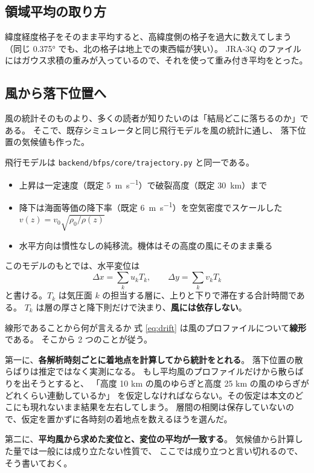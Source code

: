 \subsection{領域平均の取り方}

緯度経度格子をそのまま平均すると、高緯度側の格子を過大に数えてしまう
（同じ \ang{0.375} でも、北の格子は地上での東西幅が狭い）。
JRA-3Q のファイルにはガウス求積の重みが入っているので、それを使って重み付き平均をとった。

\subsection{風から落下位置へ}
\label{sec:drift}

風の統計そのものより、多くの読者が知りたいのは「結局どこに落ちるのか」である。
そこで、既存シミュレータと同じ飛行モデルを風の統計に通し、
落下位置の気候値も作った。

飛行モデルは \texttt{backend/bfps/core/trajectory.py} と同一である。

\begin{itemize}
  \item 上昇は一定速度（既定 \SI{5}{\metre\per\second}）で破裂高度（既定 \SI{30}{\kilo\metre}）まで
  \item 降下は海面等価の降下率（既定 \SI{6}{\metre\per\second}）を空気密度でスケールした
        $v(z) = v_0\sqrt{\rho_0/\rho(z)}$
  \item 水平方向は慣性なしの純移流。機体はその高度の風にそのまま乗る
\end{itemize}

このモデルのもとでは、水平変位は
\begin{equation}
  \Delta x = \sum_k u_k T_k, \qquad \Delta y = \sum_k v_k T_k
  \label{eq:drift}
\end{equation}
と書ける。$T_k$ は気圧面 $k$ の担当する層に、上りと下りで滞在する合計時間である。
$T_k$ は層の厚さと降下則だけで決まり、\textbf{風には依存しない}。

\begin{whybox}{線形であることから何が言えるか}
式 \eqref{eq:drift} は風のプロファイルについて\textbf{線形}である。
そこから 2 つのことが従う。

第一に、\textbf{各解析時刻ごとに着地点を計算してから統計をとれる}。
落下位置の散らばりは推定ではなく実測になる。
もし平均風のプロファイルだけから散らばりを出そうとすると、
「高度 10 km の風のゆらぎと高度 25 km の風のゆらぎがどれくらい連動しているか」
を仮定しなければならない。その仮定は本文のどこにも現れないまま結果を左右してしまう。
層間の相関は保存していないので、仮定を置かずに各時刻の着地点を数えるほうを選んだ。

第二に、\textbf{平均風から求めた変位と、変位の平均が一致する}。
気候値から計算した量では一般には成り立たない性質で、
ここでは成り立つと言い切れるので、そう書いておく。
\end{whybox}

